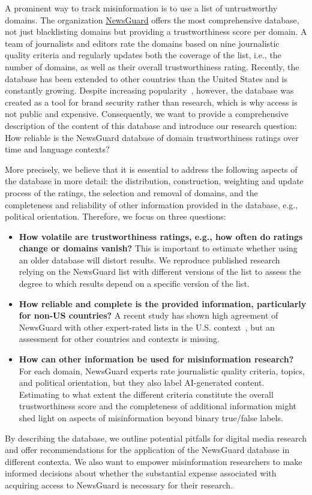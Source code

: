 \documentclass[12pt,twoside]{article}
\begin{document}
A prominent way to track misinformation is to use a list of untrustworthy domains. The organization \href{https://www.newsguardtech.com/}{NewsGuard} offers the most comprehensive database, not just blacklisting domains but providing a trustworthiness score per domain. A team of journalists and editors rate the domains based on nine journalistic quality criteria and regularly updates both the coverage of the list, i.e., the number of domains, as well as their overall trustworthiness rating. Recently, the database has been extended to other countries than the United States and is constantly growing. Despite increasing popularity~\citep[for example,][]{robertsonUsersChooseEngage2023a,lasserSocialMediaSharing2022a}, however, the database was created as a tool for brand security rather than research, which is why access is not public and expensive. Consequently, we want to provide a comprehensive description of the content of this database and introduce our research question: How reliable is the NewsGuard database of domain trustworthiness ratings over time and language contexts?

More precisely, we believe that it is essential to address the following aspects of the database in more detail: the distribution, construction, weighting and update process of the ratings, the selection and removal of domains, and the completeness and reliability of other information provided in the database, e.g., political orientation. Therefore, we focus on three questions:
\begin{itemize}
    \item \textbf{How volatile are trustworthiness ratings, e.g., how often do ratings change or domains vanish?} This is important to estimate whether using an older database will distort results. We reproduce published research relying on the NewsGuard list with different versions of the list to assess the degree to which results depend on a specific version of the list.
    \item \textbf{How reliable and complete is the provided information, particularly for non-US countries?} A recent study has shown high agreement of NewsGuard with other expert-rated lists in the U.S. context~\citep{linHighLevelCorrespondence2023}, but an assessment for other countries and contexts is missing. 
    \item \textbf{How can other information be used for misinformation research?} For each domain, NewsGuard experts rate journalistic quality criteria, topics, and political orientation, but they also label AI-generated content. Estimating to what extent the different criteria constitute the overall trustworthiness score and the completeness of additional information might shed light on aspects of misinformation beyond binary true/false labels.
\end{itemize}
By describing the database, we outline potential pitfalls for digital media research and offer recommendations for the application of the NewsGuard database in different contexta. We also want to empower misinformation researchers to make informed decisions about whether the substantial expense associated with acquiring access to NewsGuard is necessary for their research. 
\end{document}
